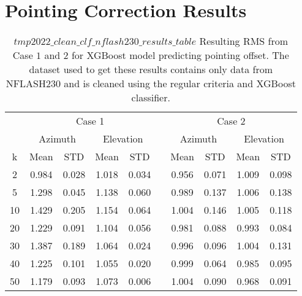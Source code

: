 \section{Pointing Correction Results}

\begin{table}[!htbp]
    \centering
    \caption{$tmp2022\_clean\_clf\_nflash230\_results\_table$
    Resulting RMS from Case $1$ and $2$ for XGBoost model predicting pointing offset.
    The dataset used to get these results contains only data from NFLASH230 and is cleaned using the regular criteria and XGBoost classifier.}
    \begin{tabular}{ccccc c cccc}
        \toprule
        \multicolumn{1}{c}{} & \multicolumn{4}{c}{Case 1} & & \multicolumn{4}{c}{Case 2} \\
        \cmidrule(lr){2-5} \cmidrule(lr){7-10}
        \multicolumn{1}{c}{} & \multicolumn{2}{c}{Azimuth} & \multicolumn{2}{c}{Elevation} & & \multicolumn{2}{c}{Azimuth} & \multicolumn{2}{c}{Elevation} \\ 
        \cmidrule(lr){2-5} \cmidrule(lr){7-10}
        k & Mean & STD & Mean & STD & & Mean & STD & Mean & STD \\ 
        \midrule
         2  &     0.984 &     0.028 &     1.018 &     0.034 &  &  0.956 &     0.071 &     1.009 &     0.098 \\
         5  &     1.298 &     0.045 &     1.138 &     0.060 &  &  0.989 &     0.137 &     1.006 &     0.138 \\
         10 &     1.429 &     0.205 &     1.154 &     0.064 &  &  1.004 &     0.146 &     1.005 &     0.118 \\
         20 &     1.229 &     0.091 &     1.104 &     0.056 &  &  0.981 &     0.088 &     0.993 &     0.084 \\
         30 &     1.387 &     0.189 &     1.064 &     0.024 &  &  0.996 &     0.096 &     1.004 &     0.131 \\
         40 &     1.225 &     0.101 &     1.055 &     0.020 &  &  0.999 &     0.064 &     0.985 &     0.095 \\
         50 &     1.179 &     0.093 &     1.073 &     0.006 &  &  1.004 &     0.090 &     0.968 &     0.091 \\
        \midrule
        \bottomrule
    \end{tabular}   
\end{table}


